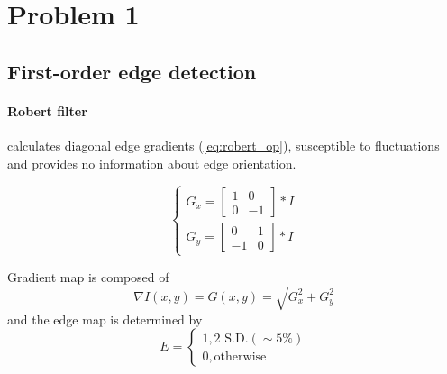 \documentclass[12pt]{article}
\begin{document}
\section*{Problem 1}
\subsection*{First-order edge detection}
\paragraph*{Robert filter} calculates diagonal edge gradients (\autoref{eq:robert_op}), susceptible to fluctuations and provides no information about edge orientation.

\begin{equation}
\label{eq:robert_op}
\begin{cases}
	G_x = \begin{bmatrix}
		1 & 0 \\ 0 & -1 
	\end{bmatrix} \ast I \\
	G_y = \begin{bmatrix}
		0 & 1 \\ -1 & 0
	\end{bmatrix} \ast I
\end{cases}
\end{equation}

\noindent
Gradient map is composed of
\begin{equation}
\label{eq:gx_gy_gxy}
	\nabla I(x, y) = G(x, y) = \sqrt{G_x^2 + G_y^2}
\end{equation}
and the edge map is determined by
\begin{equation}
\label{eq:edge_map}
E = 
\begin{cases}
	1, 2 \text{ S.D.}(\sim 5\%) \\
	0, \text{otherwise}
\end{cases}
\end{equation}
\end{document}
